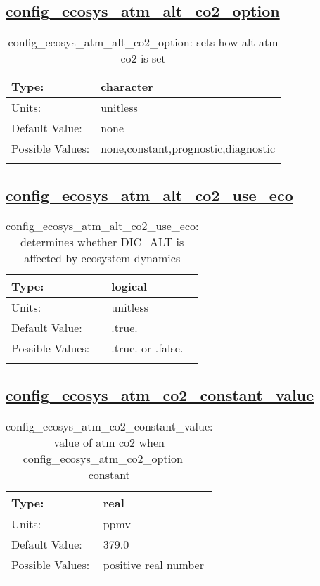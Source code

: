 \subsection[config\_ecosys\_atm\_alt\_co2\_option]{\hyperref[sec:nm_tab_tracer_forcing_ecosysTracers]{config\_ecosys\_atm\_alt\_co2\_option}}
\label{subsec:nm_sec_config_ecosys_atm_alt_co2_option}
\begin{center}
\begin{longtable}{| p{2.0in} || p{4.0in} |}
    \hline
    Type: & character \\
    \hline
    Units: & \si{unitless} \\
    \hline
    Default Value: & none \\
    \hline
    Possible Values: & none,constant,prognostic,diagnostic \\
    \hline
    \caption{config\_ecosys\_atm\_alt\_co2\_option: sets how alt atm co2 is set}
\end{longtable}
\end{center}
\subsection[config\_ecosys\_atm\_alt\_co2\_use\_eco]{\hyperref[sec:nm_tab_tracer_forcing_ecosysTracers]{config\_ecosys\_atm\_alt\_co2\_use\_eco}}
\label{subsec:nm_sec_config_ecosys_atm_alt_co2_use_eco}
\begin{center}
\begin{longtable}{| p{2.0in} || p{4.0in} |}
    \hline
    Type: & logical \\
    \hline
    Units: & \si{unitless} \\
    \hline
    Default Value: & .true. \\
    \hline
    Possible Values: & .true. or .false. \\
    \hline
    \caption{config\_ecosys\_atm\_alt\_co2\_use\_eco: determines whether DIC\_ALT is affected by ecosystem dynamics}
\end{longtable}
\end{center}
\subsection[config\_ecosys\_atm\_co2\_constant\_value]{\hyperref[sec:nm_tab_tracer_forcing_ecosysTracers]{config\_ecosys\_atm\_co2\_constant\_value}}
\label{subsec:nm_sec_config_ecosys_atm_co2_constant_value}
\begin{center}
\begin{longtable}{| p{2.0in} || p{4.0in} |}
    \hline
    Type: & real \\
    \hline
    Units: & \si{ppmv} \\
    \hline
    Default Value: & 379.0 \\
    \hline
    Possible Values: & positive real number \\
    \hline
    \caption{config\_ecosys\_atm\_co2\_constant\_value: value of atm co2 when config\_ecosys\_atm\_co2\_option = constant}
\end{longtable}
\end{center}
